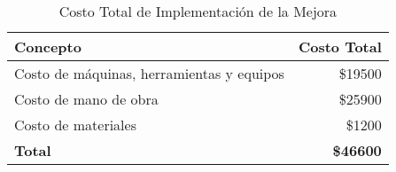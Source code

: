 \begin{table}[!ht]
\centering
\begin{tabular}{|l|r|}
\hline
\textbf{Concepto} & \textbf{Costo Total} \\ \hline
Costo de máquinas, herramientas y equipos & \$19500 \\ \hline
Costo de mano de obra & \$25900 \\ \hline
Costo de materiales & \$1200 \\ \hline
\textbf{Total} & \textbf{\$46600} \\ \hline
\end{tabular}
\caption{Costo Total de Implementación de la Mejora}
\end{table}

